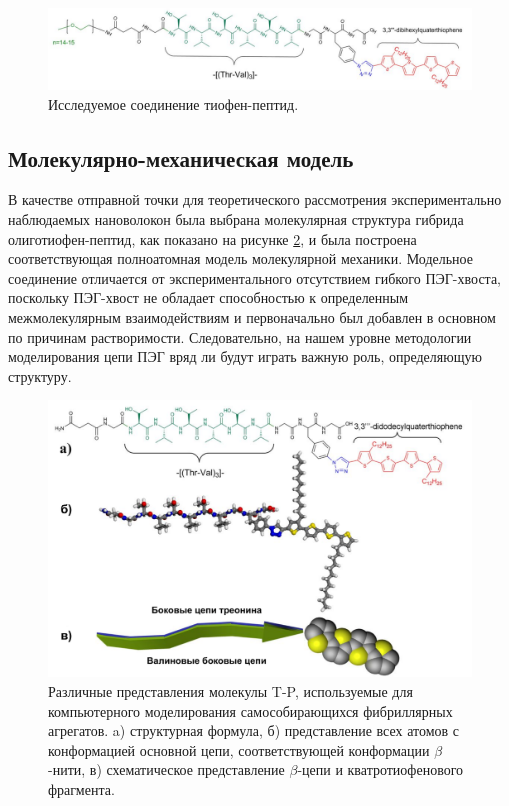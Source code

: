    \begin{figure} [H]
    \centering
    \includegraphics[width=\textwidth]{images/p4/punkt1/part4_p1_f1.pdf}
    \caption[Исследуемое соединение тиофен-пептид]{Исследуемое соединение тиофен-пептид.}
    \label{fig:p4_p1_f1}
\end{figure}
    

\subsection{Молекулярно-механическая модель}

    В качестве отправной точки для теоретического рассмотрения экспериментально наблюдаемых нановолокон была выбрана молекулярная структура гибрида олиготиофен-пептид, как показано на рисунке \ref{fig:p4_p5_f31}, и была построена соответствующая полноатомная модель молекулярной механики. Модельное соединение отличается от экспериментального отсутствием гибкого ПЭГ-хвоста, поскольку ПЭГ-хвост не обладает способностью к определенным межмолекулярным взаимодействиям и первоначально был добавлен в основном по причинам растворимости. Следовательно, на нашем уровне методологии моделирования цепи ПЭГ вряд ли будут играть важную роль, определяющую структуру.

\begin{figure} [H]
    \centering
    \includegraphics[width=\textwidth]{images/p4/punkt5/part4_p5_f31.pdf}
    \caption[Различные представления молекулы T-P, используемые для компьютерного моделирования самособирающихся фибриллярных агрегатов]{Различные представления молекулы T-P, используемые для компьютерного моделирования самособирающихся фибриллярных агрегатов. a) структурная формула, б) представление всех атомов с конформацией основной цепи, соответствующей конформации $\beta$-нити, в) схематическое представление $\beta$-цепи и кватротиофенового фрагмента.}
    \label{fig:p4_p5_f31}
\end{figure}

